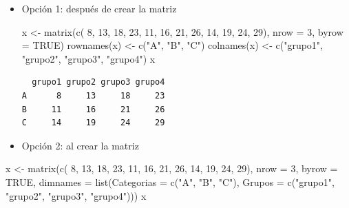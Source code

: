 \documentclass[
]{book}
\newenvironment{Shaded}{\begin{snugshade}}{\end{snugshade}}
\newcommand{\AttributeTok}[1]{\textcolor[rgb]{0.77,0.63,0.00}{#1}}
\newcommand{\ConstantTok}[1]{\textcolor[rgb]{0.00,0.00,0.00}{#1}}
\newcommand{\DecValTok}[1]{\textcolor[rgb]{0.00,0.00,0.81}{#1}}
\newcommand{\FunctionTok}[1]{\textcolor[rgb]{0.00,0.00,0.00}{#1}}
\newcommand{\NormalTok}[1]{#1}
\newcommand{\OtherTok}[1]{\textcolor[rgb]{0.56,0.35,0.01}{#1}}
\newcommand{\StringTok}[1]{\textcolor[rgb]{0.31,0.60,0.02}{#1}}
\begin{document}
\begin{itemize}
\item
  Opción 1: después de crear la matriz

\begin{Shaded}
\begin{Highlighting}[]
\NormalTok{x }\OtherTok{\textless{}{-}} \FunctionTok{matrix}\NormalTok{(}\FunctionTok{c}\NormalTok{( }\DecValTok{8}\NormalTok{, }\DecValTok{13}\NormalTok{, }\DecValTok{18}\NormalTok{, }\DecValTok{23}\NormalTok{, }
              \DecValTok{11}\NormalTok{, }\DecValTok{16}\NormalTok{, }\DecValTok{21}\NormalTok{, }\DecValTok{26}\NormalTok{, }
              \DecValTok{14}\NormalTok{, }\DecValTok{19}\NormalTok{, }\DecValTok{24}\NormalTok{, }\DecValTok{29}\NormalTok{), }
              \AttributeTok{nrow =} \DecValTok{3}\NormalTok{, }\AttributeTok{byrow =} \ConstantTok{TRUE}\NormalTok{)}
\FunctionTok{rownames}\NormalTok{(x) }\OtherTok{\textless{}{-}} \FunctionTok{c}\NormalTok{(}\StringTok{"A"}\NormalTok{, }\StringTok{"B"}\NormalTok{, }\StringTok{"C"}\NormalTok{)}
\FunctionTok{colnames}\NormalTok{(x) }\OtherTok{\textless{}{-}} \FunctionTok{c}\NormalTok{(}\StringTok{"grupo1"}\NormalTok{, }\StringTok{"grupo2"}\NormalTok{, }\StringTok{"grupo3"}\NormalTok{, }\StringTok{"grupo4"}\NormalTok{)}
\NormalTok{x}
\end{Highlighting}
\end{Shaded}

\begin{verbatim}
  grupo1 grupo2 grupo3 grupo4
A      8     13     18     23
B     11     16     21     26
C     14     19     24     29
\end{verbatim}
\item
  Opción 2: al crear la matriz
\end{itemize}

\begin{Shaded}
\begin{Highlighting}[]
\NormalTok{x }\OtherTok{\textless{}{-}} \FunctionTok{matrix}\NormalTok{(}\FunctionTok{c}\NormalTok{( }\DecValTok{8}\NormalTok{, }\DecValTok{13}\NormalTok{, }\DecValTok{18}\NormalTok{, }\DecValTok{23}\NormalTok{, }
              \DecValTok{11}\NormalTok{, }\DecValTok{16}\NormalTok{, }\DecValTok{21}\NormalTok{, }\DecValTok{26}\NormalTok{, }
              \DecValTok{14}\NormalTok{, }\DecValTok{19}\NormalTok{, }\DecValTok{24}\NormalTok{, }\DecValTok{29}\NormalTok{), }
            \AttributeTok{nrow =} \DecValTok{3}\NormalTok{, }\AttributeTok{byrow =} \ConstantTok{TRUE}\NormalTok{,}
            \AttributeTok{dimnames =} \FunctionTok{list}\NormalTok{(}\AttributeTok{Categorias =} \FunctionTok{c}\NormalTok{(}\StringTok{"A"}\NormalTok{, }\StringTok{"B"}\NormalTok{, }\StringTok{"C"}\NormalTok{), }
                            \AttributeTok{Grupos =} \FunctionTok{c}\NormalTok{(}\StringTok{"grupo1"}\NormalTok{, }\StringTok{"grupo2"}\NormalTok{, }\StringTok{"grupo3"}\NormalTok{, }\StringTok{"grupo4"}\NormalTok{)))}
\NormalTok{x}
\end{Highlighting}
\end{Shaded}
\end{document}
